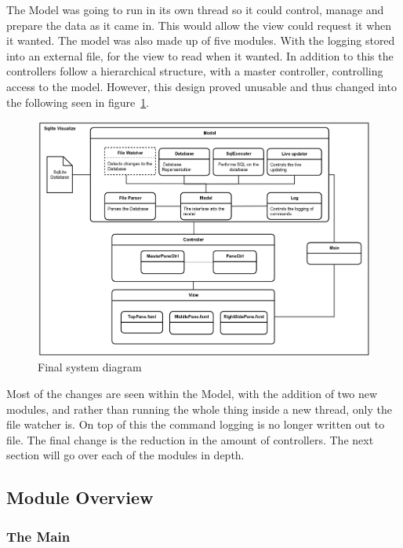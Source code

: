 The Model was going to run in its own thread so it could control, manage and prepare the data as it came in. This would allow the view could request it when it wanted. The model was also made up of five modules. With the logging stored into an external file, for the view to read when it wanted. In addition to this the controllers follow a hierarchical structure, with a master controller, controlling access to the model. However, this design proved unusable and thus changed into the following seen in figure~\ref{fig:design_new}. 

\begin{figure}[H]
	\centering
	\includegraphics[scale=0.2]{images/system_diagram_new.png}
	\caption{Final system diagram}
	\label{fig:design_new}
\end{figure}

Most of the changes are seen within the Model, with the addition of two new modules, and rather than running the whole thing inside a new thread, only the file watcher is. On top of this the command logging is no longer written out to file. The final change is the reduction in the amount of controllers. The next section will go over each of the modules in depth.

\subsection{Module Overview}
\label{subsec:module_overview}

\subsubsection{The Main}
\label{subsubsec:main}

